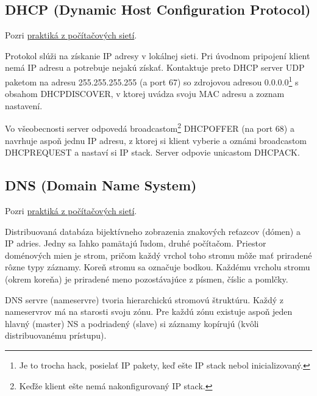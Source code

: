 \documentclass[10pt,a4paper]{article}
\begin{document}
\subsection{DHCP (Dynamic Host Configuration Protocol)} 
\label{DHCP}
Pozri \href{http://netlab.dcs.fmph.uniba.sk/siete/cviko4/}{praktiká z počítačových sietí}. 
  
Protokol slúži na získanie IP adresy v lokálnej sieti. 
Pri úvodnom pripojení klient nemá IP adresu a potrebuje nejakú získať. Kontaktuje preto DHCP server UDP paketom na adresu 255.255.255.255 (a port 67) so zdrojovou adresou 0.0.0.0\footnote{
Je to trocha hack, posielať IP pakety, keď ešte IP stack nebol inicializovaný.
} s obsahom DHCPDISCOVER, v ktorej uvádza svoju MAC adresu a zoznam nastavení. 

Vo všeobecnosti server odpovedá broadcastom\footnote{
Keďže klient ešte nemá nakonfigurovaný IP stack. 
} DHCPOFFER (na port 68) a navrhuje aspoň jednu IP adresu, z ktorej si klient vyberie a oznámi broadcastom DHCPREQUEST a nastaví si IP stack. Server odpovie unicastom DHCPACK.
  
\subsection{DNS (Domain Name System)}   
Pozri \href{http://netlab.dcs.fmph.uniba.sk/siete/cviko4/}{praktiká z počítačových sietí}. 

Distribuovaná databáza bijektívneho zobrazenia znakových reťazcov (dómen) a IP adries. Jedny sa ľahko pamätajú ľudom, druhé počítačom. Priestor doménových mien je strom, pričom každý vrchol toho stromu môže mať priradené rôzne typy záznamy. Koreň stromu sa označuje bodkou. Každému vrcholu stromu (okrem koreňa) je priradené meno pozostávajúce z písmen, číslic a pomlčky.

DNS servre (nameservre) tvoria hierarchickú stromovú štruktúru. Každý z nameservrov má na starosti svoju zónu. Pre každú zónu existuje aspoň jeden hlavný (master) NS a podriadený (slave) si záznamy kopírujú (kvôli distribuovanému prístupu). 
\end{document}
